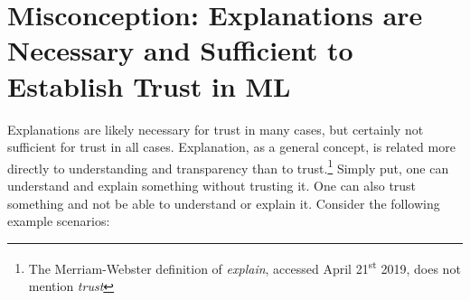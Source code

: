 \documentclass[fleqn]{article}
\begin{document}
\section{Misconception: Explanations are Necessary and Sufficient to Establish Trust in ML}

Explanations are likely necessary for trust in many cases, but certainly not sufficient for trust in all cases. 
Explanation, as a general concept, is related more directly to understanding and transparency than to trust.\footnote{The Merriam-Webster definition of \textit{explain}, accessed April 21\textsuperscript{st} 2019, does not mention \textit{trust}} Simply put, one can understand and explain something without trusting it. One can also trust something and not be able to understand or explain it. Consider the following example scenarios:
\end{document}
